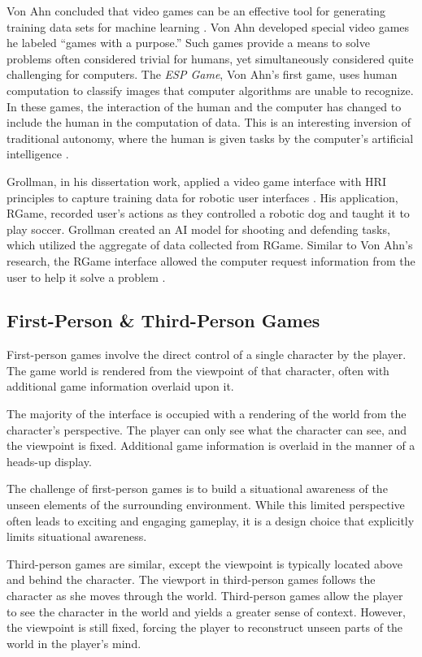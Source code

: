 Von Ahn concluded that video games can be an effective tool for generating training data sets for machine learning \cite{GWAP}. Von Ahn developed special video games he labeled ``games with a purpose.''  Such games provide a means to solve problems often considered trivial for humans, yet simultaneously considered quite challenging for computers. The \emph{ESP Game}, Von Ahn's first game, uses human computation to classify images that computer algorithms are unable to recognize. In these games, the interaction of the human and the computer has changed to include the human in the computation of data. This is an interesting inversion of traditional autonomy, where the human is given tasks by the computer's artificial intelligence \cite{GWAP}.

Grollman, in his dissertation work, applied a video game interface with HRI principles to capture training data for robotic user interfaces \cite{Grollman}. His application, RGame, recorded user’s actions as they controlled a robotic dog and taught it to play soccer. Grollman created an AI model for shooting and defending tasks, which utilized the aggregate of data collected from RGame. Similar to Von Ahn's research, the RGame interface allowed the computer request information from the user to help it solve a problem \cite{Grollman}.

\subsection{First-Person \& Third-Person Games} %
\label{sub:first_person_games}
First-person games involve the direct control of a single character by the player. The game world is rendered from the viewpoint of that character, often with additional game information overlaid upon it. 

The majority of the interface is occupied with a rendering of the world from the character’s perspective. The player can only see what the character can see, and the viewpoint is fixed. Additional game information is overlaid in the manner of a heads-up display.

The challenge of first-person games is to build a situational awareness of the unseen elements of the surrounding environment. While this limited perspective often leads to exciting and engaging gameplay, it is a design choice that explicitly limits situational awareness.

Third-person games are similar, except the viewpoint is typically located above and behind the character. The viewport in third-person games follows the character as she moves through the world. Third-person games allow the player to see the character in the world and yields a greater sense of context. However, the viewpoint is still fixed, forcing the player to reconstruct unseen parts of the world in the player's mind.

